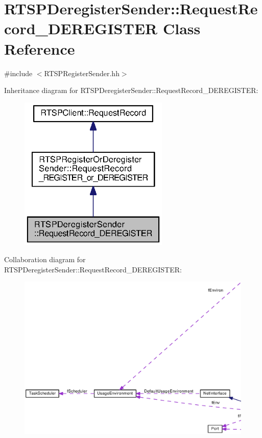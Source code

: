 \section{R\+T\+S\+P\+Deregister\+Sender\+:\+:Request\+Record\+\_\+\+D\+E\+R\+E\+G\+I\+S\+T\+E\+R Class Reference}
\label{classRTSPDeregisterSender_1_1RequestRecord__DEREGISTER}


{\ttfamily \#include $<$R\+T\+S\+P\+Register\+Sender.\+hh$>$}



Inheritance diagram for R\+T\+S\+P\+Deregister\+Sender\+:\+:Request\+Record\+\_\+\+D\+E\+R\+E\+G\+I\+S\+T\+E\+R\+:
\nopagebreak
\begin{figure}[H]
\begin{center}
\leavevmode
\includegraphics[width=202pt]{classRTSPDeregisterSender_1_1RequestRecord__DEREGISTER__inherit__graph}
\end{center}
\end{figure}


Collaboration diagram for R\+T\+S\+P\+Deregister\+Sender\+:\+:Request\+Record\+\_\+\+D\+E\+R\+E\+G\+I\+S\+T\+E\+R\+:
\nopagebreak
\begin{figure}[H]
\begin{center}
\leavevmode
\includegraphics[width=350pt]{classRTSPDeregisterSender_1_1RequestRecord__DEREGISTER__coll__graph}
\end{center}
\end{figure}
